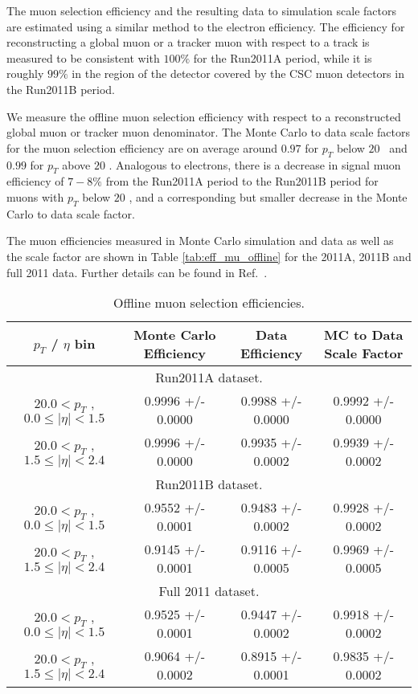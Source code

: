 
The muon selection efficiency and the resulting data to simulation
scale factors are estimated using a similar method to the electron efficiency. 
The efficiency for reconstructing a global muon or a tracker muon with respect
to a track is measured to be consistent with $100\%$ for the Run2011A period, 
while it is roughly $99\%$ in the region of the detector covered by the 
CSC muon detectors in the Run2011B period.

We measure the offline muon selection efficiency with respect to a reconstructed 
global muon or tracker muon denominator. 
The Monte Carlo to data scale factors for the 
muon selection efficiency are on average around $0.97$ for $p_{T}$ below $20$ 
\GeV\ and $0.99$ for $p_{T}$ above $20$ \GeV.  
Analogous to electrons, there is a decrease in signal muon efficiency of $7-8\%$ from the
Run2011A period to the Run2011B period for muons with 
$p_{T}$ below $20$ \GeV, and a corresponding but smaller decrease in the 
Monte Carlo to data scale factor. 

The muon efficiencies measured in Monte Carlo simulation and data as well as the scale
factor are shown in Table \ref{tab:eff_mu_offline} for the 2011A, 2011B and full 2011 data.
Further details can be found in Ref.~\cite{HWW2011Final}.


 \begin{table}[!ht]
 \begin{center}
 \begin{tabular}{|c|c|c|c|}
 \hline
 $p_{T}$ / $\eta$ bin    &  Monte Carlo Efficiency    &  Data Efficiency   &  MC to Data Scale Factor \\   
\hline
\multicolumn{4}{c}{Run2011A dataset.} \\
\hline
$ 20.0 < p_{T} $ , $  0.0  \le |\eta| <   1.5$   &       0.9996 +/- 0.0000   &       0.9988 +/- 0.0000   &       0.9992 +/- 0.0000   \\
\hline
$ 20.0 < p_{T} $ , $  1.5  \le |\eta| <   2.4$   &       0.9996 +/- 0.0000   &       0.9935 +/- 0.0002   &       0.9939 +/- 0.0002   \\
\hline
\multicolumn{4}{c}{Run2011B dataset.} \\
\hline
$ 20.0 < p_{T} $ , $  0.0  \le |\eta| <   1.5$   &       0.9552 +/- 0.0001   &       0.9483 +/- 0.0002   &       0.9928 +/- 0.0002   \\
\hline
$ 20.0 < p_{T} $ , $  1.5  \le |\eta| <   2.4$   &       0.9145 +/- 0.0001   &       0.9116 +/- 0.0005   &       0.9969 +/- 0.0005   \\
\hline
\multicolumn{4}{c}{Full 2011 dataset.} \\
\hline
$ 20.0 < p_{T} $ , $  0.0  \le |\eta| <   1.5$   &       0.9525 +/- 0.0001   &       0.9447 +/- 0.0002   &       0.9918 +/- 0.0002   \\
\hline
$ 20.0 < p_{T} $ , $  1.5  \le |\eta| <   2.4$   &       0.9064 +/- 0.0002   &       0.8915 +/- 0.0001   &       0.9835 +/- 0.0002   \\
\hline
\end{tabular}
\caption{Offline muon selection efficiencies.}
\label{tab:eff_ele_offline}
\end{center}
\end{table}

